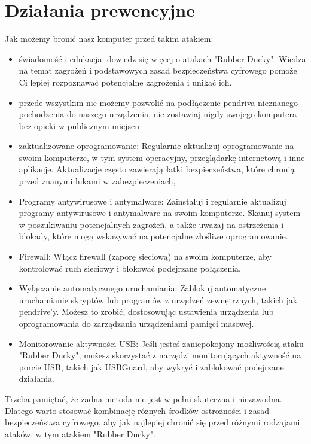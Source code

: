 \documentclass{article}
\begin{document}
\section{Działania prewencyjne}
Jak możemy bronić nasz komputer przed takim atakiem:
\begin{itemize}
    \item świadomość i edukacja: dowiedz się więcej o atakach "Rubber Ducky". Wiedza na temat zagrożeń i podstawowych zasad bezpieczeństwa cyfrowego pomoże Ci lepiej rozpoznawać potencjalne zagrożenia i unikać ich.
    \item przede wszystkim nie możemy pozwolić na podłączenie pendriva nieznanego pochodzenia do naszego urządzenia, nie zostawiaj nigdy swojego komputera bez opieki w publicznym miejscu
    \item zaktualizowane oprogramowanie: Regularnie aktualizuj oprogramowanie na swoim komputerze, w tym system operacyjny, przeglądarkę internetową i inne aplikacje. Aktualizacje często zawierają łatki bezpieczeństwa, które chronią przed znanymi lukami w zabezpieczeniach,
    \item Programy antywirusowe i antymalware: Zainstaluj i regularnie aktualizuj programy antywirusowe i antymalware na swoim komputerze. Skanuj system w poszukiwaniu potencjalnych zagrożeń, a także uważaj na ostrzeżenia i blokady, które mogą wskazywać na potencjalne złośliwe oprogramowanie.
    \item Firewall: Włącz firewall (zaporę sieciową) na swoim komputerze, aby kontrolować ruch sieciowy i blokować podejrzane połączenia.
    \item Wyłączanie automatycznego uruchamiania: Zablokuj automatyczne uruchamianie skryptów lub programów z urządzeń zewnętrznych, takich jak pendrive'y. Możesz to zrobić, dostosowując ustawienia urządzenia lub oprogramowania do zarządzania urządzeniami pamięci masowej.
    \item Monitorowanie aktywności USB: Jeśli jesteś zaniepokojony możliwością ataku "Rubber Ducky", możesz skorzystać z narzędzi monitorujących aktywność na porcie USB, takich jak USBGuard, aby wykryć i zablokować podejrzane działania.
\end{itemize}

Trzeba pamiętać, że żadna metoda nie jest w pełni skuteczna i niezawodna. Dlatego warto stosować kombinację różnych środków ostrożności i zasad bezpieczeństwa cyfrowego, aby jak najlepiej chronić się przed różnymi rodzajami ataków, w tym atakiem "Rubber Ducky".
\end{document}
